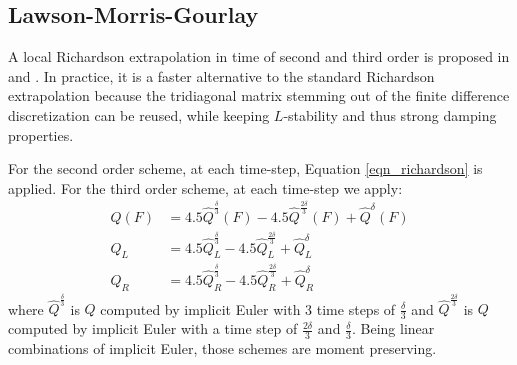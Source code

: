 \documentclass[]{rAMF2e}
\begin{document}
\subsection{Lawson-Morris-Gourlay}
A local Richardson extrapolation in time of second and third order is proposed in \citep{lawson1978extrapolation} and \citep{gourlay1980extrapolation}. In practice, it is a faster alternative to the standard Richardson extrapolation because the tridiagonal matrix stemming out of the finite difference discretization can be reused, while keeping $L$-stability and thus strong damping properties.

For the second order scheme, at each time-step, Equation \ref{eqn_richardson} is applied.
For the third order scheme, at each time-step we apply:
\begin{align}\label{eqn_richardson}
Q(F) &= 4.5 \hat{Q}^{\frac{\delta}{3}}(F) - 4.5 \hat{Q}^{\frac{2\delta}{3}}(F)  + \hat{Q}^{\delta}(F)\\
Q_L &= 4.5 \hat{Q}^{\frac{\delta}{3}}_L - 4.5 \hat{Q}^{\frac{2\delta}{3}}_L  + \hat{Q}^{\delta}_L\\
Q_R &= 4.5 \hat{Q}^{\frac{\delta}{3}}_R - 4.5 \hat{Q}^{\frac{2\delta}{3}}_R  + \hat{Q}^{\delta}_R
\end{align}
where $\hat{Q}^{\frac{\delta}{3}}$ is $Q$ computed by implicit Euler with 3 time steps of $\frac{\delta}{3}$ and $\hat{Q}^{\frac{2\delta}{3}}$ is $Q$ computed by implicit Euler with a time step of $\frac{2\delta}{3}$ and $\frac{\delta}{3}$. Being linear combinations of implicit Euler, those schemes are moment preserving.
\end{document}
